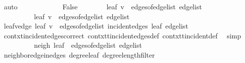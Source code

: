 \begin{isabellebody}
\ auto\isanewline
\ \ \ \ \isamarkupfalse%
\isanewline
\ \ \ \ \ \ \isamarkupfalse%
\ False\isanewline
\ \ \ \ \ \ \isamarkupfalse%
\ {\isachardoublequoteopen}{\isacharbraceleft}{\kern0pt}leaf{\isacharcomma}{\kern0pt}\ v{\isacharbraceright}{\kern0pt}\ {\isasymnotin}\ edges{\isacharunderscore}{\kern0pt}of{\isacharunderscore}{\kern0pt}edge{\isacharunderscore}{\kern0pt}list\ {\isacharquery}{\kern0pt}edge{\isacharunderscore}{\kern0pt}list{\isachardoublequoteclose}\isanewline
\ \ \ \ \ \ \isamarkupfalse%
\isanewline
\ \ \ \ \ \ \ \ \isamarkupfalse%
\ {\isachardoublequoteopen}{\isacharbraceleft}{\kern0pt}leaf{\isacharcomma}{\kern0pt}\ v{\isacharbraceright}{\kern0pt}\ {\isasymin}\ edges{\isacharunderscore}{\kern0pt}of{\isacharunderscore}{\kern0pt}edge{\isacharunderscore}{\kern0pt}list\ {\isacharquery}{\kern0pt}edge{\isacharunderscore}{\kern0pt}list{\isachardoublequoteclose}\isanewline
\ \ \ \ \ \ \ \ \isamarkupfalse%
\ \isamarkupfalse%
\ leaf{\isacharunderscore}{\kern0pt}v{\isacharunderscore}{\kern0pt}edge{\isacharcolon}{\kern0pt}\ {\isachardoublequoteopen}{\isacharbraceleft}{\kern0pt}leaf{\isacharcomma}{\kern0pt}\ v{\isacharbraceright}{\kern0pt}\ {\isasymin}\ edges{\isacharunderscore}{\kern0pt}of{\isacharunderscore}{\kern0pt}edge{\isacharunderscore}{\kern0pt}list\ {\isacharparenleft}{\kern0pt}incident{\isacharunderscore}{\kern0pt}edges\ leaf\ {\isacharquery}{\kern0pt}edge{\isacharunderscore}{\kern0pt}list{\isacharparenright}{\kern0pt}{\isachardoublequoteclose}\isanewline
\ \ \ \ \ \ \ \ \ \ \isamarkupfalse%
\ contxt{\isachardot}{\kern0pt}incident{\isacharunderscore}{\kern0pt}edges{\isacharunderscore}{\kern0pt}correct\ contxt{\isachardot}{\kern0pt}t{\isachardot}{\kern0pt}incident{\isacharunderscore}{\kern0pt}edges{\isacharunderscore}{\kern0pt}def\ contxt{\isachardot}{\kern0pt}t{\isachardot}{\kern0pt}incident{\isacharunderscore}{\kern0pt}def\ \isamarkupfalse%
\ simp\isanewline
\ \ \ \ \ \ \ \ \isamarkupfalse%
\ {\isachardoublequoteopen}{\isacharbraceleft}{\kern0pt}{\isacharquery}{\kern0pt}neigh{\isacharcomma}{\kern0pt}\ leaf{\isacharbraceright}{\kern0pt}\ {\isasymin}\ edges{\isacharunderscore}{\kern0pt}of{\isacharunderscore}{\kern0pt}edge{\isacharunderscore}{\kern0pt}list\ {\isacharquery}{\kern0pt}edge{\isacharunderscore}{\kern0pt}list{\isachardoublequoteclose}\ \isamarkupfalse%
\ neighbor{\isacharunderscore}{\kern0pt}edge{\isacharunderscore}{\kern0pt}in{\isacharunderscore}{\kern0pt}edges\ degree{\isacharunderscore}{\kern0pt}leaf\ degree{\isacharunderscore}{\kern0pt}length{\isacharunderscore}{\kern0pt}filter\ \isamarkupfalse%

\end{isabellebody}
